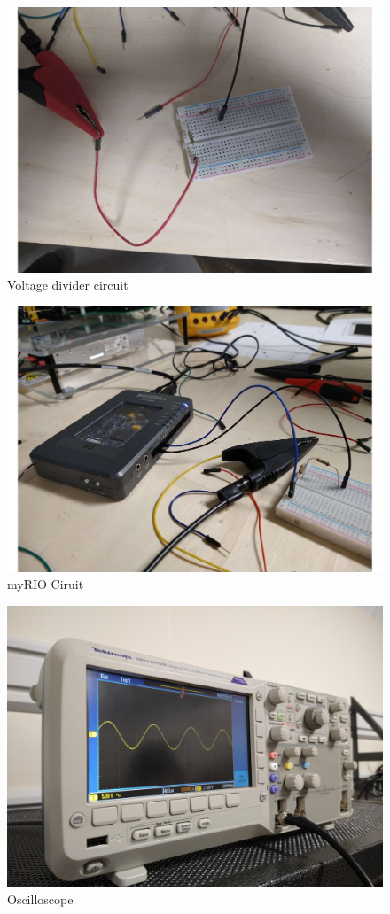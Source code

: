 \documentclass[10pt,twocolumn]{article}
\begin{document}
\begin{figure}
	\centering
	\includegraphics[width=.9\linewidth]{figures/vdc.pdf}
	\caption{Voltage divider circuit}
	\label{fig:circuit}
\end{figure}

\begin{figure}
	\centering
	\includegraphics[width=.9\linewidth]{figures/myr.pdf}
	\caption{myRIO Ciruit}
	\label{fig:myrio}
\end{figure}

\begin{figure}
	\centering
	\includegraphics[width=.9\linewidth]{figures/Oscilloscope.PNG}
	\caption{Oscilloscope}
	\label{fig:stable}
\end{figure}
\end{document}
